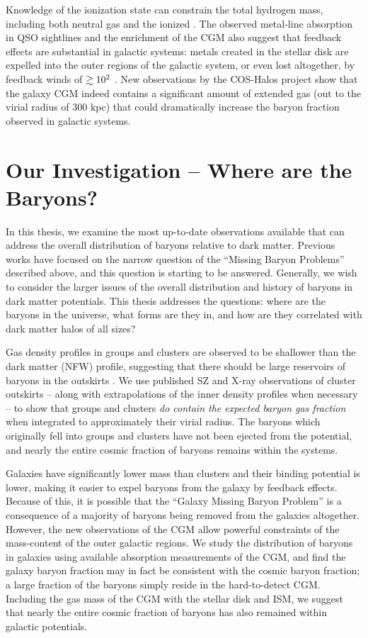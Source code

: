 Knowledge of the ionization state can constrain the total hydrogen
mass, including both neutral  gas and the ionized
. The observed metal-line absorption in QSO sightlines and
the enrichment of the CGM also suggest that feedback effects are
substantial in galactic systems: metals created in the stellar disk
are expelled into the outer regions of the galactic system, or even
lost altogether, by feedback winds of $\gtrsim 10^2$ \kms{}
\citep{D'Odorico1991, Chen2010, Oppenheimer2012, Booth2012}. New
observations by the COS-Halos project show that the galaxy CGM indeed
contains a significant amount of extended gas (out to the virial
radius of 300 kpc) that could dramatically increase the baryon
fraction observed in galactic systems. 

\section{Our Investigation -- Where are the Baryons?}
\label{sec:investigation}

In this thesis, we examine the most up-to-date observations available
that can address the overall distribution of baryons relative to dark
matter. Previous works have focused on the narrow question of the
``Missing Baryon Problems'' described above, and this question is
starting to be answered. Generally, we wish to consider the larger
issues of the overall distribution and history of baryons in dark
matter potentials. This thesis addresses the questions: where are the
baryons in the universe, what forms are they in, and how are they correlated with dark matter
halos of all sizes?

Gas density profiles in groups and clusters are observed to be
shallower than the dark matter (NFW) profile, suggesting that there
should be large reservoirs of baryons in the outskirts
. We use published SZ and X-ray observations of
cluster outskirts -- along with extrapolations of the inner density
profiles when necessary -- to show that groups and clusters \textit{do
  contain the expected baryon gas fraction} when integrated to
approximately their virial radius. The baryons which originally fell
into groups and clusters have not been ejected from the potential, and
nearly the entire cosmic fraction of baryons remains within the systems.

Galaxies have significantly lower mass than clusters and their binding
potential is lower, making it easier to expel baryons from the galaxy
by feedback effects. Because of this, it is possible that the ``Galaxy
Missing Baryon Problem'' is a consequence of a majority of baryons
being removed from the galaxies altogether. However, the new
observations of the CGM allow powerful constraints of the mass-content
of the outer galactic regions. We study the distribution of baryons in
galaxies using available absorption measurements of the CGM, and find
the galaxy baryon fraction may in fact be consistent with the cosmic
baryon fraction; a large fraction of the baryons simply reside in the
hard-to-detect CGM. Including the gas mass of the CGM with the stellar
disk and ISM, we suggest that nearly the entire cosmic fraction of
baryons has also remained within galactic potentials.

